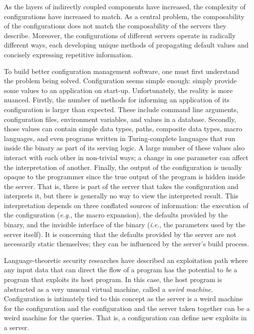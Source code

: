 \documentclass[letterpaper,twocolumn,10pt]{article}
\begin{document}
As the layers of indirectly coupled components have increased, the complexity of configurations have increased to match. As a central problem, the composability of the configurations does not match the composability of the servers they describe. Moreover, the configurations of different servers operate in radically different ways, each developing unique methods of propagating default values and concisely expressing repetitive information.

To build better configuration management software, one must first understand the problem being solved. Configuration seems simple enough: simply provide some values to an application on start-up. Unfortunately, the reality is more nuanced. Firstly, the number of methods for informing an application of its configuration is larger than expected. These include command line arguments, configuration files, environment variables, and values in a database. Secondly, those values can contain simple data types, paths, composite data types, macro languages, and even programs written in Turing-complete languages that run inside the binary as part of its serving logic. A large number of these values also interact with each other in non-trivial ways; a change in one parameter can affect the interpretation of another. Finally, the output of the configuration is usually opaque to the programmer since the true output of the program is hidden inside the server. That is, there is part of the server that takes the configuration and interprets it, but there is generally no way to view the interpreted result. This interpretation depends on three conflated sources of information: the execution of the configuration (\emph{e.g.}, the macro expansion), the defaults provided by the binary, and the invisible interface of the binary (\emph{i.e.}, the parameters used by the server itself). It is concerning that the defaults provided by the server are not necessarily static themselves; they can be influenced by the server's build process.

Language-theoretic security researches have described an exploitation path where any input data that can direct the flow of a program has the potential to \emph{be} a program that exploits its host program. In this case, the host program is abstracted as a very unusual virtual machine, called a \emph{weird machine}.\cite{cats,weird} Configuration is intimately tied to this concept as the server is a weird machine for the configuration and the configuration and the server taken together can be a weird machine for the queries. That is, a configuration can define new exploits in a server.
\end{document}
